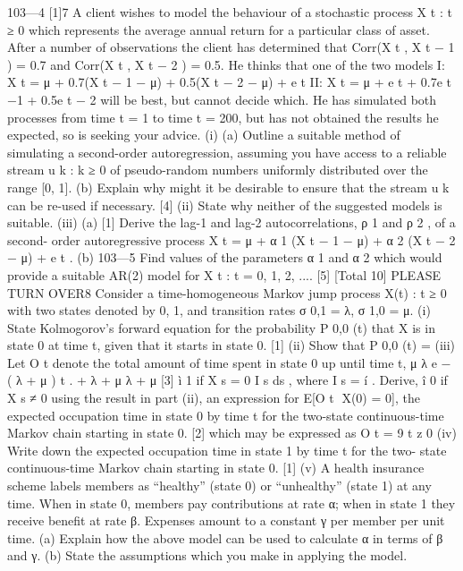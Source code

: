 \documentclass[a4paper,12pt]{article}
\begin{document}
\begin{enumerate}
103—4
[1]7
A client wishes to model the behaviour of a stochastic process {X t : t ≥ 0} which
represents the average annual return for a particular class of asset. After a
number of observations the client has determined that Corr(X t , X t − 1 ) = 0.7 and
Corr(X t , X t − 2 ) = 0.5. He thinks that one of the two models
I: X t = μ + 0.7(X t − 1 − μ) + 0.5(X t − 2 − μ) + e t
II: X t = μ + e t + 0.7e t −1 + 0.5e t − 2
will be best, but cannot decide which. He has simulated both processes from time
t = 1 to time t = 200, but has not obtained the results he expected, so is seeking
your advice.
(i)
(a) Outline a suitable method of simulating a second-order
autoregression, assuming you have access to a reliable stream
{u k : k ≥ 0} of pseudo-random numbers uniformly distributed over
the range [0, 1].
(b) Explain why might it be desirable to ensure that the stream {u k }
can be re-used if necessary.
[4]
(ii) State why neither of the suggested models is suitable.
(iii) (a)
[1]
Derive the lag-1 and lag-2 autocorrelations, ρ 1 and ρ 2 , of a second-
order autoregressive process
X t = μ + α 1 (X t − 1 − μ) + α 2 (X t − 2 − μ) + e t .
(b)
103—5
Find values of the parameters α 1 and α 2 which would provide a
suitable AR(2) model for {X t : t = 0, 1, 2, ...}.
[5]
[Total 10]
PLEASE TURN OVER8
Consider a time-homogeneous Markov jump process {X(t) : t ≥ 0} with two states
denoted by 0, 1, and transition rates σ 0,1 = λ, σ 1,0 = μ.
(i) State Kolmogorov’s forward equation for the probability P 0,0 (t) that X is in
state 0 at time t, given that it starts in state 0.
[1]
(ii) Show that P 0,0 (t) =
(iii) Let O t denote the total amount of time spent in state 0 up until time t,
μ
λ
e − ( λ + μ ) t .
+
λ + μ λ + μ
[3]
ì 1 if X s = 0
I s ds , where I s = í
. Derive,
î 0 if X s ≠ 0
using the result in part (ii), an expression for E[O t X(0) = 0], the expected
occupation time in state 0 by time t for the two-state continuous-time
Markov chain starting in state 0.
[2]
which may be expressed as O t =
9
t
z 0
(iv) Write down the expected occupation time in state 1 by time t for the two-
state continuous-time Markov chain starting in state 0.
[1]
(v) A health insurance scheme labels members as “healthy” (state 0) or
“unhealthy” (state 1) at any time. When in state 0, members pay
contributions at rate α; when in state 1 they receive benefit at rate β.
Expenses amount to a constant γ per member per unit time.
(a) Explain how the above model can be used to calculate α in terms
of β and γ.
(b) State the assumptions which you make in applying the model.

\end{enumerate}
\end{document}

